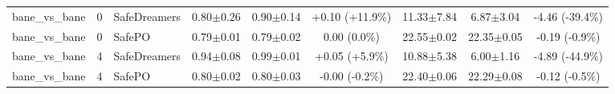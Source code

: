 \documentclass{article}
\begin{document}
\begin{longtable}{lclcccccc}
\midrule
bane\_vs\_bane & 0 & SafeDreamers & 0.80$\pm$0.26 & 0.90$\pm$0.14 & \textcolor{green!55!black}{+0.10 (+11.9\%)} & 11.33$\pm$7.84 & 6.87$\pm$3.04 & \textcolor{green!85!black}{-4.46 (-39.4\%)} \\
bane\_vs\_bane & 0 & SafePO & 0.79$\pm$0.01 & 0.79$\pm$0.02 & \textcolor{red!40!black}{0.00 (0.0\%)} & 22.55$\pm$0.02 & 22.35$\pm$0.05 & \textcolor{green!40!black}{-0.19 (-0.9\%)} \\
bane\_vs\_bane & 4 & SafeDreamers & 0.94$\pm$0.08 & 0.99$\pm$0.01 & \textcolor{green!55!black}{+0.05 (+5.9\%)} & 10.88$\pm$5.38 & 6.00$\pm$1.16 & \textcolor{green!85!black}{-4.89 (-44.9\%)} \\
bane\_vs\_bane & 4 & SafePO & 0.80$\pm$0.02 & 0.80$\pm$0.03 & \textcolor{red!40!black}{-0.00 (-0.2\%)} & 22.40$\pm$0.06 & 22.29$\pm$0.08 & \textcolor{green!40!black}{-0.12 (-0.5\%)} \\
\midrule
\bottomrule
\end{longtable}
\end{document}
